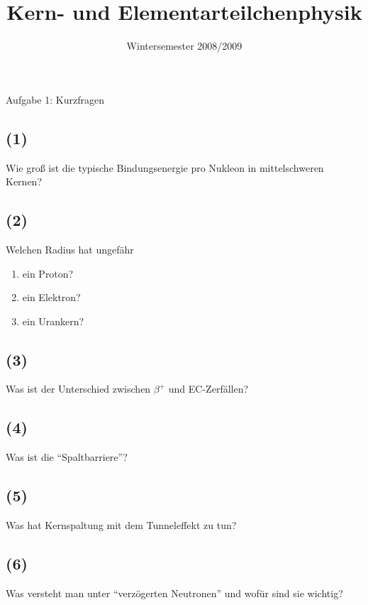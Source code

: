 

\subject{KET}
\title{Kern- und Elementarteilchenphysik}
\date{
    Wintersemester 2008/2009
}



\maketitle
\thispagestyle{empty}
\newpage


\begin{aufgabe}{Aufgabe 1: Kurzfragen}
    \subsection{(1)}
    Wie groß ist die typische Bindungsenergie pro Nukleon in mittelschweren Kernen?

    \subsection{(2)}
    Welchen Radius hat ungefähr
    \begin{enumerate}[label=(\roman*)]
        \item ein Proton?
        \item ein Elektron?
        \item ein Urankern?
    \end{enumerate}

    \subsection{(3)}
    Was ist der Unterschied zwischen $\beta^+$ und EC-Zerfällen?

    \subsection{(4)}
    Was ist die \enquote{Spaltbarriere}?

    \subsection{(5)}
    Was hat Kernspaltung mit dem Tunneleffekt zu tun?

    \subsection{(6)}
    Was versteht man unter \enquote{verzögerten Neutronen} und wofür sind sie wichtig?


\end{aufgabe}
